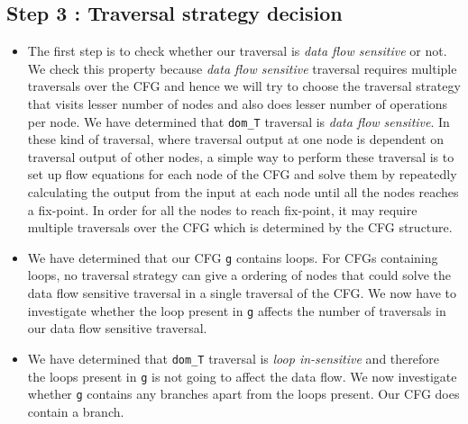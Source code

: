 \subsection{Step 3 : Traversal strategy decision}
\begin{itemize}
\item The first step is to check whether our traversal is \textit{data flow sensitive} or not. We check this property because \textit{data flow sensitive} traversal requires multiple traversals over the CFG and hence we will try to choose the traversal strategy that visits lesser number of nodes and also does lesser number of operations per node. 
We have determined that \texttt{dom\_T} traversal is \textit{data flow sensitive}. In these kind of traversal, where traversal output at one node is dependent on traversal output of other nodes, a simple way to perform these traversal is to set up flow equations for each node of the CFG and solve them by repeatedly calculating the output from the input at each node until all the nodes reaches a fix-point. In order for all the nodes to reach fix-point, it may require multiple traversals over the CFG which is determined by the CFG structure.
\item We have determined that our CFG \texttt{g} contains loops. For CFGs containing loops, no traversal strategy can give a ordering of nodes that could solve the data flow sensitive traversal in a single traversal of the CFG. We now have to investigate whether the loop present in \texttt{g} affects the number of traversals in our data flow sensitive traversal.
\item We have determined that \texttt{dom\_T} traversal is \textit{loop in-sensitive} and therefore the loops present in \texttt{g} is not going to affect the data flow. We now investigate whether \texttt{g} contains any branches apart from the loops present. Our CFG does contain a branch. 

\end{itemize}
